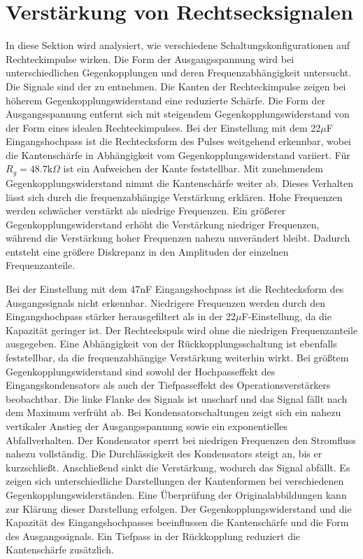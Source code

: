 \section{Verstärkung von Rechtsecksignalen}
\label{sec:A3}
In diese Sektion wird analysiert, wie verschiedene Schaltungskonfigurationen auf Rechteckimpulse wirken. Die Form der Ausgangsspannung wird bei unterschiedlichen Gegenkopplungen und deren Frequenzabhängigkeit untersucht.
Die Signale sind der  zu entnehmen.
Die Kanten der Rechteckimpulse zeigen bei höherem Gegenkopplungswiderstand eine reduzierte Schärfe. Die Form der Ausgangsspannung entfernt sich mit steigendem Gegenkopplungswiderstand von der Form eines idealen Rechteckimpulses. Bei der Einstellung mit dem 22$\mu$F Eingangshochpass ist die Rechtecksform des Pulses weitgehend erkennbar, wobei die Kantenschärfe in Abhängigkeit vom Gegenkopplungswiderstand variiert. Für $R_g = 48.7\mathrm{k}\Omega$ ist ein Aufweichen der Kante feststellbar. Mit zunehmendem Gegenkopplungswiderstand nimmt die Kantenschärfe weiter ab.
Dieses Verhalten lässt sich durch die frequenzabhängige Verstärkung erklären. Hohe Frequenzen werden schwächer verstärkt als niedrige Frequenzen. Ein größerer Gegenkopplungswiderstand erhöht die Verstärkung niedriger Frequenzen, während die Verstärkung hoher Frequenzen nahezu unverändert bleibt. Dadurch entsteht eine größere Diskrepanz in den Amplituden der einzelnen Frequenzanteile.

Bei der Einstellung mit dem 47nF Eingangshochpass ist die Rechtecksform des Ausgangssignals nicht erkennbar. Niedrigere Frequenzen werden durch den Eingangshochpass stärker herausgefiltert als in der 22$\mu$F-Einstellung, da die Kapazität geringer ist. Der Rechteckspuls wird ohne die niedrigen Frequenzanteile ausgegeben. Eine Abhängigkeit von der Rückkopplungsschaltung ist ebenfalls feststellbar, da die frequenzabhängige Verstärkung weiterhin wirkt. Bei größtem Gegenkopplungswiderstand sind sowohl der Hochpasseffekt des Eingangskondensators als auch der Tiefpasseffekt des Operationsverstärkers beobachtbar. Die linke Flanke des Signals ist unscharf und das Signal fällt nach dem Maximum verfrüht ab.
Bei Kondensatorschaltungen zeigt sich ein nahezu vertikaler Anstieg der Ausgangsspannung sowie ein exponentielles Abfallverhalten. Der Kondensator sperrt bei niedrigen Frequenzen den Stromfluss nahezu vollständig. Die Durchlässigkeit des Kondensators steigt an, bis er kurzschließt. Anschließend sinkt die Verstärkung, wodurch das Signal abfällt.
Es zeigen sich unterschiedliche Darstellungen der Kantenformen bei verschiedenen Gegenkopplungswiderständen. Eine Überprüfung der Originalabbildungen kann zur Klärung dieser Darstellung erfolgen.
Der Gegenkopplungswiderstand und die Kapazität des Eingangshochpasses beeinflussen die Kantenschärfe und die Form des Ausgangssignals. Ein Tiefpass in der Rückkopplung reduziert die Kantenschärfe zusätzlich.


